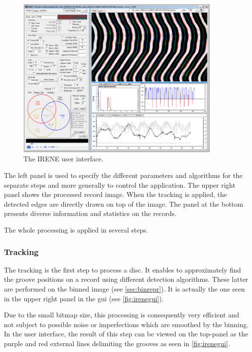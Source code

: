 \begin{figure}[!ht]
\centering
\includegraphics[width=0.9\textwidth]{images/rene-gui}
\caption{The IRENE user interface.}
\label{fig:irenegui}
\end{figure}

The left panel is used to specify the different parameters and algorithms for the separate steps and more generally to control the application. The upper right panel shows the processed record image. When the tracking is applied, the detected edges are directly drawn on top of the image. The panel at the bottom presents diverse information and statistics on the records.

The whole processing is applied in several steps.

\subsubsection{Tracking}

The tracking is the first step to process a disc. It enables to approximately find the groove positions on a record using different detection algorithms. These latter are performed on the binned image (see \autoref{sec:binrepr}). It is actually the one seen in the upper right panel in the \gls{gui} (see \autoref{fig:irenegui}).

Due to the small bitmap size, this processing is consequently very efficient and not subject to possible noise or imperfections which are smoothed by the binning. In the user interface, the result of this step can be viewed on the top-panel as the purple and red external lines delimiting the grooves as seen in \autoref{fig:irenegui}.

